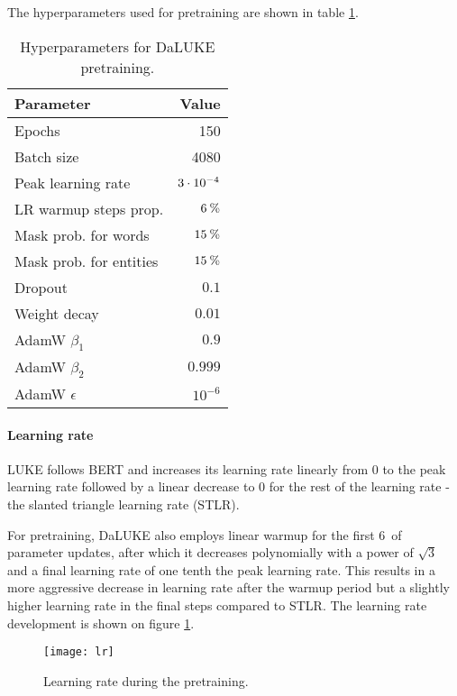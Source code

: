 \documentclass[main.tex]{subfiles}
\begin{document}
The hyperparameters used for pretraining are shown in table \ref{tab:pretrain-hyper}.
\begin{table}[H]
    \centering
    \begin{tabular}{l|r}
        Parameter  &    Value\\\hline
        Epochs     & 150\\
        Batch size &    4080\\
        Peak learning rate & $3\cdot10^{-4}$\\
        LR warmup steps prop. & $ 6\:\text{\%{}} $\\
        Mask prob. for words & $ 15\:\text{\%{}} $\\
        Mask prob. for entities & $ 15\:\text{\%{}} $\\
        Dropout & $ 0.1 $\\
        Weight decay & $ 0.01 $\\
        AdamW $ \beta_1 $ & $ 0.9 $\\
        AdamW $ \beta_2 $ & $ 0.999 $\\
        AdamW $ \epsilon $ & $ 10^{-6} $
    \end{tabular}
    \caption{Hyperparameters for DaLUKE pretraining.}\label{tab:pretrain-hyper}
\end{table}\noindent

\paragraph{Learning rate}
LUKE follows BERT and increases its learning rate linearly from 0 to the peak learning rate followed by a linear decrease to 0 for the rest of the learning rate - the slanted triangle learning rate (STLR). \cite{devlin2019bert} \cite{yamada2020luke} \cite{howardruder2018universal}

For pretraining, DaLUKE also employs linear warmup for the first 6\pro\ of parameter updates, after which it decreases polynomially with a power of $ \sqrt{3} $ and a final learning rate of one tenth the peak learning rate.
This results in a more aggressive decrease in learning rate after the warmup period but a slightly higher learning rate in the final steps compared to STLR.
The learning rate development is shown on figure \ref{fig:lr}.
\begin{figure}[H]
    \centering
    \texttt{[image: lr]}
    \caption{Learning rate during the pretraining.}
    \label{fig:lr}
\end{figure}\noindent
\end{document}
